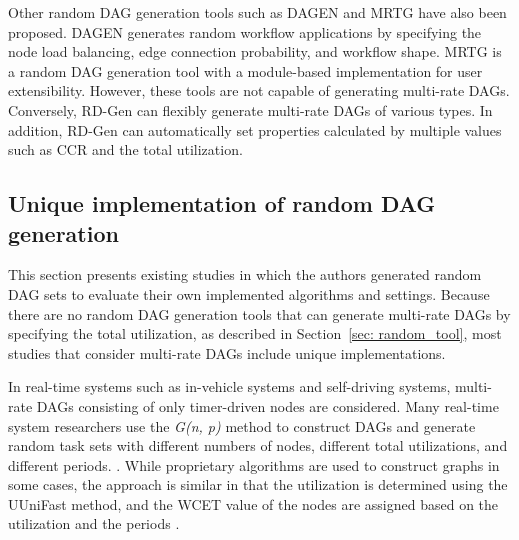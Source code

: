 Other random DAG generation tools such as DAGEN \cite{amalarethinam2011dagen} and MRTG \cite{ashish2016modular} have also been proposed.
DAGEN generates random workflow applications by specifying the node load balancing, edge connection probability, and workflow shape.
MRTG is a random DAG generation tool with a module-based implementation for user extensibility.
However, these tools are not capable of generating multi-rate DAGs.
Conversely, RD-Gen can flexibly generate multi-rate DAGs of various types.
In addition, RD-Gen can automatically set properties calculated by multiple values such as CCR and the total utilization.


\subsection{Unique implementation of random DAG generation}

This section presents existing studies in which the authors generated random DAG sets to evaluate their own implemented algorithms and settings.
Because there are no random DAG generation tools that can generate multi-rate DAGs by specifying the total utilization, as described in Section~\ref{sec: random_tool}, most studies that consider multi-rate DAGs include unique implementations.

In real-time systems such as in-vehicle systems and self-driving systems, multi-rate DAGs consisting of only timer-driven nodes are considered.
Many real-time system researchers use the {\it G(n, p)} method to construct DAGs and generate random task sets with different numbers of nodes, different total utilizations, and different periods. \cite{voronov2021ai, he2021response, dong2019efficient}.
While proprietary algorithms are used to construct graphs in some cases, the approach is similar in that the utilization is determined using the UUniFast method, and the WCET value of the nodes are assigned based on the utilization and the periods \cite{yang2020mixed, gunzel2021suspension, ueter2021hard}.

